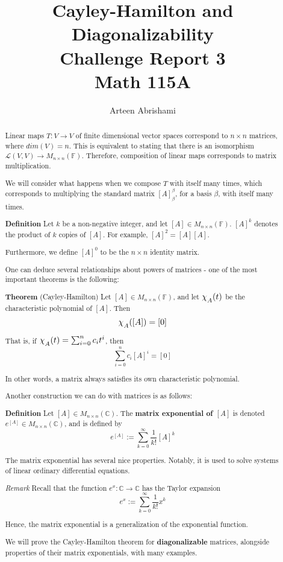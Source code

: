 \documentclass[12pt, letterpaper]{article}
\title{
Cayley-Hamilton and Diagonalizability \\
\large Challenge Report 3 \\
Math 115A}
\author{Arteen Abrishami}
\date{}
\newcommand{\F}{\mathbb{F}}
\newcommand{\C}{\mathbb{C}}
\begin{document}
\maketitle

\begin{abstract}

Linear maps $T: V \to V$ of finite dimensional vector spaces correspond to $n \times n$ matrices, where $dim(V)=n$. This is equivalent to stating that there is an isomorphism $\mathcal{L}(V,V) \to M_{n \times n}(\F)$. Therefore, composition of linear maps corresponds to matrix multiplication.  

We will consider what happens when we compose $T$ with itself many times, which corresponds to multiplying the standard matrix $[A]_{\beta}^{\beta}$, for a basis $\beta$, with itself many times.

\textbf{Definition}
    Let $k$ be a non-negative integer, and let $[A] \in M_{n\times n}(\F)$. 
 $[A]^k$ denotes the product of $k$ copies of $[A]$. For example, $[A]^2 = [A][A]$.

    Furthermore, we define $[A]^0$ to be the $n \times n$ identity matrix.

One can deduce several relationships about powers of matrices - one of the most important theorems is the following:

\textbf{Theorem} (Cayley-Hamilton)
    Let $[A] \in M_{n\times n}(\F)$, and let $\chi_{\raisebox{-.5ex}{$\scriptstyle A$}}(t)$ be the characteristic polynomial of $[A]$.  Then $$\chi_{\raisebox{-.5ex}{$\scriptstyle A$}}([A]) = [0]$$

    That is, if $\chi_{\raisebox{-.5ex}{$\scriptstyle A$}}(t) = \sum_{i=0}^n c_it^i$, then 
    $$\sum_{i=0}^n c_i[A]^i = [0]$$

In other words, a matrix always satisfies its own characteristic polynomial.

\vspace{0.5pt}

Another construction we can do with matrices is as follows:

\textbf{Definition}
    Let $[A] \in M_{n\times n}(\C)$.  The \textbf{matrix exponential of $[A]$} is denoted $e^{[A]} \in M_{n\times n}(\C)$, and is defined by 
    $$e^{[A]} := \sum_{k=0}^\infty \frac{1}{k!} [A]^k$$

The matrix exponential has several nice properties. Notably, it is used to solve systems of linear ordinary differential equations.

\emph{Remark}
    Recall that the function $e^x : \C \to \C$ has the Taylor expansion
    $$e^{x} := \sum_{k=0}^\infty \frac{1}{k!} x^k$$

    Hence, the matrix exponential is a generalization of the exponential function.

We will prove the Cayley-Hamilton theorem for \textbf{diagonalizable} matrices, alongside properties of their matrix exponentials, with many examples.

\end{abstract}
\end{document}
